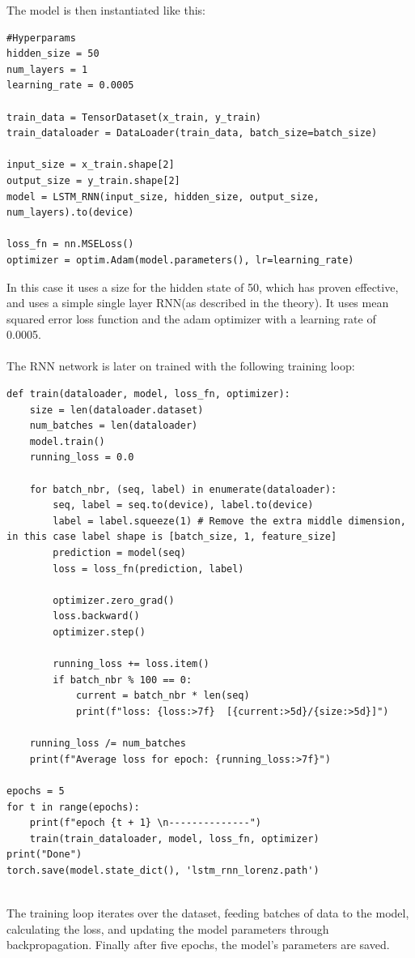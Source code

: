 \documentclass[11pt]{article}
\begin{document}
The model is then instantiated like this:
\begin{lstlisting}
#Hyperparams
hidden_size = 50  
num_layers = 1  
learning_rate = 0.0005

train_data = TensorDataset(x_train, y_train)
train_dataloader = DataLoader(train_data, batch_size=batch_size)

input_size = x_train.shape[2]  
output_size = y_train.shape[2] 
model = LSTM_RNN(input_size, hidden_size, output_size, num_layers).to(device)

loss_fn = nn.MSELoss()
optimizer = optim.Adam(model.parameters(), lr=learning_rate)
\end{lstlisting}

In this case it uses a size for the hidden state of 50, which has proven effective, and uses a simple single layer RNN(as described in the theory). It uses mean squared error loss function and the adam optimizer with a learning rate of 0.0005. \\ \\  The RNN network is later on trained with the following training loop:

\begin{lstlisting}
def train(dataloader, model, loss_fn, optimizer):
    size = len(dataloader.dataset)
    num_batches = len(dataloader)
    model.train()
    running_loss = 0.0

    for batch_nbr, (seq, label) in enumerate(dataloader):
        seq, label = seq.to(device), label.to(device)
        label = label.squeeze(1) # Remove the extra middle dimension, in this case label shape is [batch_size, 1, feature_size]
        prediction = model(seq)
        loss = loss_fn(prediction, label)

        optimizer.zero_grad()
        loss.backward()
        optimizer.step()

        running_loss += loss.item()
        if batch_nbr % 100 == 0:
            current = batch_nbr * len(seq)
            print(f"loss: {loss:>7f}  [{current:>5d}/{size:>5d}]")

    running_loss /= num_batches
    print(f"Average loss for epoch: {running_loss:>7f}")

epochs = 5
for t in range(epochs):
    print(f"epoch {t + 1} \n--------------")
    train(train_dataloader, model, loss_fn, optimizer)
print("Done")
torch.save(model.state_dict(), 'lstm_rnn_lorenz.path')
    
\end{lstlisting}
The training loop iterates over the dataset, feeding batches of data to the model, calculating the loss, and updating the model parameters through backpropagation. Finally after five epochs, the model's parameters are saved.
\end{document}
